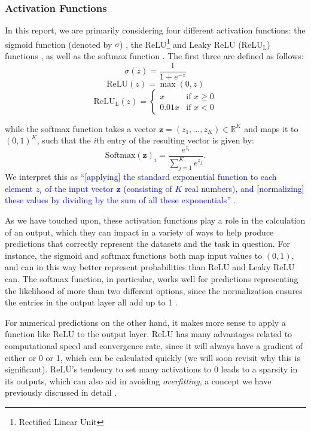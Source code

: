\subsubsection{Activation Functions}
In this report, we are primarily considering four different activation functions: the sigmoid function (denoted by $\sigma$) \cite{sigmoid}, the ReLU\footnote{Rectified Linear Unit} and Leaky ReLU (ReLU$_\text{L}$) functions \cite{ReLU}, as well as the softmax function \cite{softmax}. The first three are defined as follows:
\[\sigma(z) = \frac{1}{1 + e^{-z}}\]
\[\text{ReLU}(z) = \max(0, z)\]
\begin{equation*}
\text{ReLU}_{\text{L}}(z) = 
\begin{cases} 
    x & \text{if } x \geq 0 \\
    0.01 x & \text{if } x < 0 
\end{cases}
\end{equation*}

while the softmax function takes a vector $\boldsymbol z = (z_1, ..., z_K) \in \mathbb{R}^K$ and maps it to $(0,1)^K$, such that the $i$th entry of the resulting vector is given by:
\[\text{Softmax}(\boldsymbol z)_i = \frac{e^{z_i}}{\sum_{j=1}^{K} e^{z_j}}.\]
We interpret this as \textcolor{blue}{``[applying] the standard exponential function to each element $z_{i}$ of the input vector $\boldsymbol z$ (consisting of $K$ real numbers), and [normalizing] these values by dividing by the sum of all these exponentials'' \cite{softmax}.} 

As we have touched upon, these activation functions play a role in the calculation of an output, which they can impact in a variety of ways to help produce predictions that correctly represent the datasets and the task in question. For instance, the sigmoid and softmax functions both map input values to $(0,1)$, and can in this way better represent probabilities than ReLU and Leaky ReLU can. The softmax function, in particular, works well for predictions representing the likelihood of more than two different options, since the normalization ensures the entries in the output layer all add up to 1 \cite{softmax}. 

For numerical predictions on the other hand, it makes more sense to apply a function like ReLU to the output layer. ReLU has many advantages related to computational speed and convergence rate, since it will always have a gradient of either or 0 or 1, which can be calculated quickly \cite{mediumReLU} (we will soon revisit why this is significant). ReLU's tendency to set many activations to 0 leads to a sparsity in its outputs, which can also aid in avoiding \emph{overfitting}, a concept we have previously discussed in detail \cite{fysstkproject1}. 

